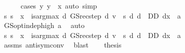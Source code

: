 \begin{isabellebody}
\ \ \ \ \isamarkupfalse%
\ {\isacharparenleft}{\kern0pt}cases\ {\isachardoublequoteopen}{\isasymexists}y{\isachardot}{\kern0pt}\ y\ {\isacharless}{\kern0pt}\ x{\isachardoublequoteclose}{\isacharparenright}{\kern0pt}\ {\isacharparenleft}{\kern0pt}auto\ simp{\isacharcolon}{\kern0pt}\ {\isacharasterisk}{\kern0pt}{\isacharparenright}{\kern0pt}\isanewline
\ \ \isamarkupfalse%
\ {\isachardoublequoteopen}{\isacharparenleft}{\kern0pt}{\isasymAnd}s{\isachardot}{\kern0pt}\ s\ {\isacharless}{\kern0pt}\ x\ {\isasymLongrightarrow}\ is{\isacharunderscore}{\kern0pt}arg{\isacharunderscore}{\kern0pt}max\ {\isacharparenleft}{\kern0pt}{\isasymlambda}d{\isachardot}{\kern0pt}\ GS{\isacharunderscore}{\kern0pt}rec{\isacharunderscore}{\kern0pt}step\ d\ v\ {\isachardollar}{\kern0pt}\ s{\isacharparenright}{\kern0pt}\ {\isacharparenleft}{\kern0pt}{\isasymlambda}d{\isachardot}{\kern0pt}\ d\ {\isasymin}\ D\isactrlsub D{\isacharparenright}{\kern0pt}\ {\isacharparenleft}{\kern0pt}d{\isacharparenleft}{\kern0pt}x\ {\isacharcolon}{\kern0pt}{\isacharequal}{\kern0pt}\ a{\isacharparenright}{\kern0pt}{\isacharparenright}{\kern0pt}{\isacharparenright}{\kern0pt}{\isachardoublequoteclose}\isanewline
\ \ \ \ \isamarkupfalse%
\ GS{\isacharunderscore}{\kern0pt}opt{\isacharunderscore}{\kern0pt}indep{\isacharunderscore}{\kern0pt}high\ a\ \isamarkupfalse%
\ auto\isanewline
\ \ \isamarkupfalse%
\ {\isachardoublequoteopen}{\isacharparenleft}{\kern0pt}{\isasymAnd}s{\isachardot}{\kern0pt}\ s\ {\isasymle}\ x\ {\isasymLongrightarrow}\ is{\isacharunderscore}{\kern0pt}arg{\isacharunderscore}{\kern0pt}max\ {\isacharparenleft}{\kern0pt}{\isasymlambda}d{\isachardot}{\kern0pt}\ GS{\isacharunderscore}{\kern0pt}rec{\isacharunderscore}{\kern0pt}step\ d\ v\ {\isachardollar}{\kern0pt}\ s{\isacharparenright}{\kern0pt}\ {\isacharparenleft}{\kern0pt}{\isasymlambda}d{\isachardot}{\kern0pt}\ d\ {\isasymin}\ D\isactrlsub D{\isacharparenright}{\kern0pt}\ {\isacharparenleft}{\kern0pt}d{\isacharparenleft}{\kern0pt}x\ {\isacharcolon}{\kern0pt}{\isacharequal}{\kern0pt}\ a{\isacharparenright}{\kern0pt}{\isacharparenright}{\kern0pt}{\isacharparenright}{\kern0pt}{\isachardoublequoteclose}\isanewline
\ \ \ \ \isamarkupfalse%
\ assms{\isacharparenleft}{\kern0pt}{}{\isacharparenright}{\kern0pt}\ antisym{\isacharunderscore}{\kern0pt}conv{}\ \isamarkupfalse%
\ blast\isanewline
\ \ \isamarkupfalse%
\ {\isacharquery}{\kern0pt}thesis\isanewline
\ \ \ \ \isamarkupfalse%

\end{isabellebody}
